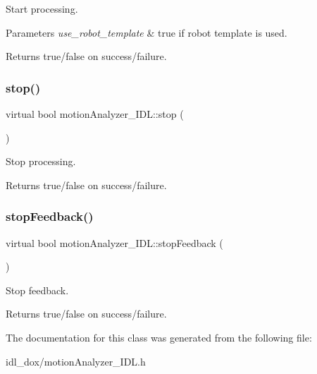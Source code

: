 Start processing. 


\begin{DoxyParams}{Parameters}
{\em use\+\_\+robot\+\_\+template} & true if robot template is used. \\
\hline
\end{DoxyParams}
\begin{DoxyReturn}{Returns}
true/false on success/failure. 
\end{DoxyReturn}
\mbox{\label{classmotionAnalyzer__IDL_affddad47070a4fdb10357c10037f39f5}} 
\subsubsection{\texorpdfstring{stop()}{stop()}}
{\footnotesize\ttfamily virtual bool motion\+Analyzer\+\_\+\+I\+D\+L\+::stop (\begin{DoxyParamCaption}{ }\end{DoxyParamCaption})\hspace{0.3cm}{\ttfamily [virtual]}}



Stop processing. 

\begin{DoxyReturn}{Returns}
true/false on success/failure. 
\end{DoxyReturn}
\mbox{\label{classmotionAnalyzer__IDL_a6753e9b8772e76ed6fbb4d39616f1423}} 
\subsubsection{\texorpdfstring{stop\+Feedback()}{stopFeedback()}}
{\footnotesize\ttfamily virtual bool motion\+Analyzer\+\_\+\+I\+D\+L\+::stop\+Feedback (\begin{DoxyParamCaption}{ }\end{DoxyParamCaption})\hspace{0.3cm}{\ttfamily [virtual]}}



Stop feedback. 

\begin{DoxyReturn}{Returns}
true/false on success/failure. 
\end{DoxyReturn}


The documentation for this class was generated from the following file\+:\begin{DoxyCompactItemize}
\item 
idl\+\_\+dox/motion\+Analyzer\+\_\+\+I\+D\+L.\+h\end{DoxyCompactItemize}
